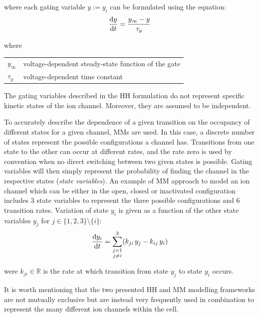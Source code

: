 \noindent
where each gating variable $y:=y_i$ can be formulated using the equation:
%
\begin{equation}
    \dfrac{\mathrm{d}{y}}{\mathrm{d}{t}} = \frac{y_{\infty}-y}{\tau_y}
\end{equation}

\noindent
where

\vspace{0.5cm}
\begin{tabular}{ll}
$y_{\infty}$ & voltage-dependent steady-state function of the gate \\
$\tau_{y}$ & voltage-dependent time constant
\end{tabular}

\vspace{0.5cm}
\noindent
The gating variables described in the HH formulation do not represent specific kinetic states of the ion channel. Moreover, they are assumed to be independent.

\vspace{0.2cm}
To accurately describe the dependence of a given transition on the occupancy of different states for a given channel, MMs are used. In this case, a discrete number of states represent the possible configurations a channel has. Transitions from one state to the other can occur at different rates, and the rate zero is used by convention when no direct switching between two given states is possible. Gating variables will then simply represent the probability of finding the channel in the respective states (\textit{state variables}). An example of MM approach to model an ion channel which can be either in the open, closed or inactivated configuration includes $3$ state variables to represent the three possible configurations and $6$ transition rates. Variation of state $y_i$ is given as a function of the other state variables $y_j$ for $j\in\{1,2,3\}\setminus{\{i\}}$:
%
\begin{equation}
    \dfrac{\mathrm{d}{y_i}}{\mathrm{d}{t}} = \sum_{\substack{j=1 \\ j\neq i}}^{3} (k_{ji}\,y_j-k_{ij}\,y_i)
\end{equation}

\noindent
were $k_{ji}\in\mathbb{R}$ is the rate at which transition from state $y_j$ to state $y_i$ occurs.

\vspace{0.5cm}
It is worth mentioning that the two presented HH and MM modelling frameworks are not mutually exclusive but are instead very frequently used in combination to represent the many different ion channels within the cell.

